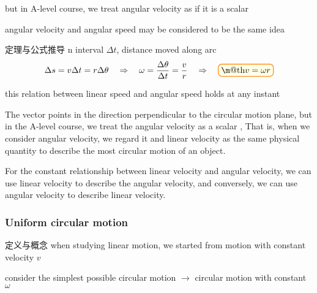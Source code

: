 \documentclass[a4paper,11pt]{article}
\makeatletter
\renewcommand{\boxed}[1]{\textcolor{black}{%
\tikz[baseline={([yshift=-.72ex] current bounding box.center)}] \node [thick, rectangle, minimum width=1ex,rounded corners,fill=yellow!10, draw=orange] {\normalcolor\m@th$\displaystyle#1$};}}
\numberwithin{equation}{section}
\numberwithin{figure}{section}
\makeatother
\begin{document}
but in A-level course, we treat angular velocity as if it is a scalar

angular velocity and angular speed may be considered to be the same idea

\begin{kousiki}{定理与公式推导}
n interval $\Delta t$, distance moved along arc
\[\Delta s=v\Delta t=r \Delta\theta \RA \omega = \frac{\Delta \theta}{\Delta t} = \frac{v}{r} \RA \boxed{v=\omega r}\]

this relation between linear speed and angular speed holds at any instant
\end{kousiki}

The vector points in the direction perpendicular to the circular motion plane, but in the A-level course, we treat the angular velocity as a scalar
, That is, when we consider angular velocity, we regard it and linear velocity as the same physical quantity to describe the most circular motion of an object.

For the constant relationship between linear velocity and angular velocity, we can use linear velocity to describe the angular velocity, and conversely, we can use angular velocity to describe linear velocity.



\subsubsection{Uniform circular motion}


\begin{ascboxZ}{定义与概念}
when studying linear motion, we started from motion with constant velocity $v$

consider the simplest possible circular motion $\longrightarrow$ circular motion with constant $\omega$
\end{ascboxZ}
\end{document}
